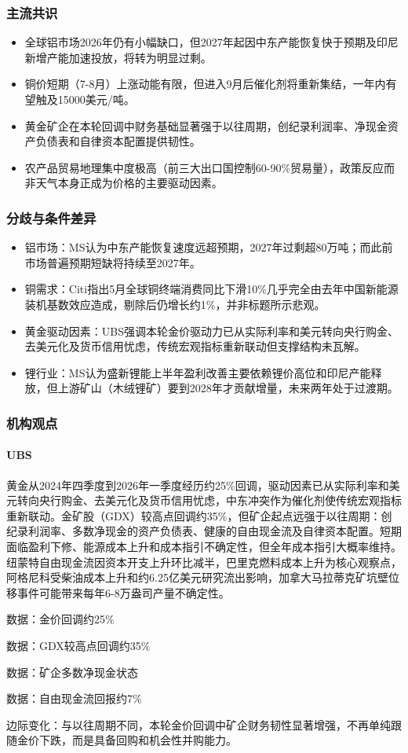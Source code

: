 \documentclass[11pt]{ctexart}
\begin{document}
\subsubsection*{主流共识}
\begin{itemize}
  \item 全球铝市场2026年仍有小幅缺口，但2027年起因中东产能恢复快于预期及印尼新增产能加速投放，将转为明显过剩。
  \item 铜价短期（7-8月）上涨动能有限，但进入9月后催化剂将重新集结，一年内有望触及15000美元/吨。
  \item 黄金矿企在本轮回调中财务基础显著强于以往周期，创纪录利润率、净现金资产负债表和自律资本配置提供韧性。
  \item 农产品贸易地理集中度极高（前三大出口国控制60-90\%贸易量），政策反应而非天气本身正成为价格的主要驱动因素。
\end{itemize}
\subsubsection*{分歧与条件差异}
\begin{itemize}
  \item 铝市场：MS认为中东产能恢复速度远超预期，2027年过剩超80万吨；而此前市场普遍预期短缺将持续至2027年。
  \item 铜需求：Citi指出5月全球铜终端消费同比下滑10\%几乎完全由去年中国新能源装机基数效应造成，剔除后仍增长约1\%，并非标题所示悲观。
  \item 黄金驱动因素：UBS强调本轮金价驱动力已从实际利率和美元转向央行购金、去美元化及货币信用忧虑，传统宏观指标重新联动但支撑结构未瓦解。
  \item 锂行业：MS认为盛新锂能上半年盈利改善主要依赖锂价高位和印尼产能释放，但上游矿山（木绒锂矿）要到2028年才贡献增量，未来两年处于过渡期。
\end{itemize}
\subsubsection*{机构观点}
\paragraph{UBS} 黄金从2024年四季度到2026年一季度经历约25\%回调，驱动因素已从实际利率和美元转向央行购金、去美元化及货币信用忧虑，中东冲突作为催化剂使传统宏观指标重新联动。金矿股（GDX）较高点回调约35\%，但矿企起点远强于以往周期：创纪录利润率、多数净现金的资产负债表、健康的自由现金流及自律资本配置。短期面临盈利下修、能源成本上升和成本指引不确定性，但全年成本指引大概率维持。纽蒙特自由现金流因资本开支上升环比减半，巴里克燃料成本上升为核心观察点，阿格尼科受柴油成本上升和约6.25亿美元研究流出影响，加拿大马拉蒂克矿坑壁位移事件可能带来每年6-8万盎司产量不确定性。
{\small\color{refgray}数据：金价回调约25\%\par}
{\small\color{refgray}数据：GDX较高点回调约35\%\par}
{\small\color{refgray}数据：矿企多数净现金状态\par}
{\small\color{refgray}数据：自由现金流回报约7\%\par}
{\small\color{refgray}边际变化：与以往周期不同，本轮金价回调中矿企财务韧性显著增强，不再单纯跟随金价下跌，而是具备回购和机会性并购能力。\par}
\end{document}
